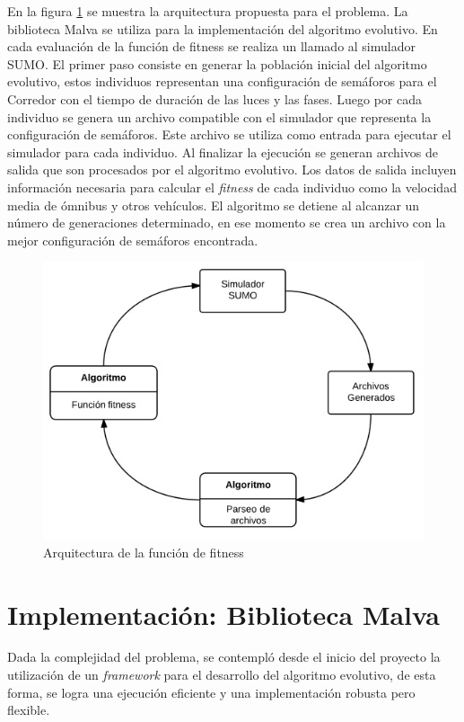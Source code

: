En la figura \ref{fig:arquitectura1} se muestra la arquitectura propuesta para el problema. La biblioteca Malva se utiliza para la implementación del algoritmo evolutivo. En cada evaluación de la función de fitness se realiza un llamado al simulador SUMO. El primer paso consiste en generar la población inicial del algoritmo evolutivo, estos individuos representan una configuración de semáforos para el Corredor con el tiempo de duración de las luces y las fases. Luego por cada individuo se genera un archivo compatible con el simulador que representa la configuración de semáforos. Este archivo se utiliza como entrada para ejecutar el simulador para cada individuo. Al finalizar la ejecución se generan archivos de salida que son procesados por el algoritmo evolutivo. Los datos de salida incluyen información necesaria para calcular el \emph{fitness} de cada individuo como la velocidad media de ómnibus y otros vehículos. El algoritmo se detiene al alcanzar un número de generaciones determinado, en ese momento se crea un archivo con la mejor configuración de semáforos encontrada. 

\begin{figure}[H]
	\centering
	\includegraphics[width=0.7\linewidth]{Figures/arquitectura1}
	\caption{Arquitectura de la función de fitness}
	\label{fig:arquitectura1}
\end{figure}


\section{Implementación: Biblioteca Malva}

Dada la complejidad del problema, se contempló desde el inicio del proyecto la utilización de un \emph{framework} para el desarrollo del algoritmo evolutivo, de esta forma, se logra una ejecución eficiente y una implementación robusta pero flexible. 

